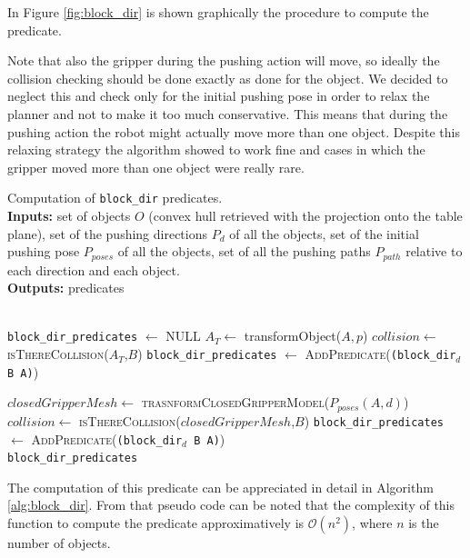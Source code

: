 In Figure \ref{fig:block_dir} is shown graphically the procedure to compute the predicate. 


Note that also the gripper during the pushing action will move, so ideally the collision checking should be done exactly as done for the object. We decided to neglect this and check only for the initial pushing pose in order to relax the planner and not to make it too much conservative. This means that during the pushing action the robot might actually move more than one object. Despite this relaxing strategy the algorithm showed to work fine and cases in which the gripper moved more than one object were really rare.

\begin{algorithm}[h]
\caption{Computation of \texttt{block\_dir} predicates. \\
\textbf{Inputs:} set of objects $O$ (convex hull retrieved with the projection onto the table plane), set of the pushing directions $P_d$ of all the objects, set of the initial pushing pose $P_{poses}$ of all the objects, set of all the pushing paths $P_{path}$ relative to each direction and each object. \\
\textbf{Outputs:}  predicates}\label{alg:block_dir}
\begin{algorithmic}
\\
\texttt{block\_dir\_predicates} $\gets$ \textsc{NULL}
  \State $A_T \gets$ {\sc transformObject($A,p$)}
	\State $collision \gets$ \textsc{isThereCollision($A_T$,$B$)}
		\State \texttt{block\_dir\_predicates} $\gets$ \textsc{AddPredicate}(\texttt{(block\_dir$_d$ B A)})
	\EndIf
  \EndIf
  \EndFor 
  \EndFor

  \State $closedGripperMesh \gets$ \textsc{trasnformClosedGripperModel}($P_{poses}(A,d)$)
	\State $collision \gets$ \textsc{isThereCollision($closedGripperMesh$,$B$)}
		\State \texttt{block\_dir\_predicates} $\gets$ \textsc{AddPredicate}(\texttt{(block\_dir$_d$ B A)})
	\EndIf
  \EndIf
  \EndFor
\EndFor 
\EndFor \\
\Return  \texttt{block\_dir\_predicates}
\EndFunction
\end{algorithmic}
\end{algorithm}  
The computation of this predicate can be appreciated in detail in Algorithm \ref{alg:block_dir}. From that pseudo code can be noted that the complexity of this function to compute the predicate approximatively is %
$\mathcal{O}(n^2)$, where $n$ is the number of objects. 

